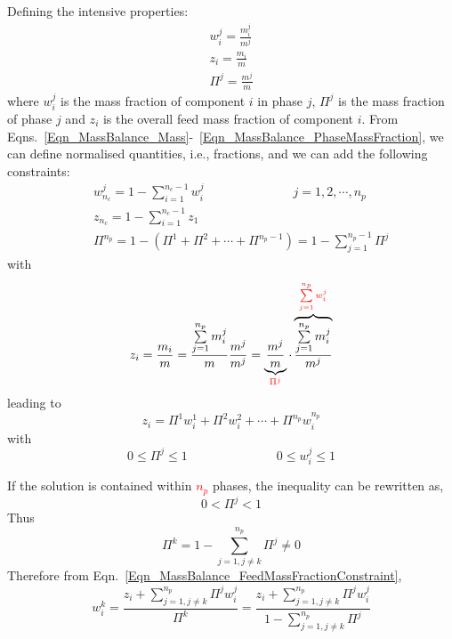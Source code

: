 \documentclass[12pts,a4paper,amsmath,amssymb,floatfix]{article}%
\renewcommand\leq{\leqslant}
\newcommand{\frc}{\displaystyle\frac}
\newcommand{\summation}{\sum\limits}
\newcommand{\red}{\textcolor{red}}
\begin{document}
Defining the intensive properties:
\begin{eqnarray}
w_{i}^{j} = \frc{m_{i}^{j}}{m^{j}} \label{Eqn_MassBalance_MassFraction} \\
z_{i} = \frc{m_{i}}{m} \label{Eqn_MassBalance_MassFractionFeeding} \\
\Pi^{j} = \frc{m^{j}}{m}\label{Eqn_MassBalance_PhaseMassFraction} 
\end{eqnarray}
where $w_{i}^{j}$ is the mass fraction of component $i$ in phase $j$, $\Pi^{j}$ is the mass fraction of phase $j$ and $z_{i}$ is the overall feed mass fraction of component $i$. From Eqns.~\ref{Eqn_MassBalance_Mass}-~\ref{Eqn_MassBalance_PhaseMassFraction}, we can define normalised quantities, i.e., fractions, and we can add the following constraints:
\begin{eqnarray}
&&w_{n_{c}}^{j} = 1 - \summation_{i=1}^{n_{c}-1}w_{i}^{j}  \hspace{3cm} j=1,2,\cdots,n_{p}  \label{Eqn_MassBalance_MassFraction2} \\
&&z_{n_{c}} = 1 - \summation_{i=1}^{n_{c}-1}z_{1}  \\
&&\Pi^{n_{p}} = 1 - \left(\Pi^{1} + \Pi^{2} + \cdots + \Pi^{n_{p}-1}\right) = 1 - \summation_{j=1}^{n_{p}-1} \Pi^{j}\label{Eqn_MassBalance_PhaseMassFraction2}
\end{eqnarray} 
with
\begin{displaymath}
  z_{i} = \frc{m_{i}}{m} = \frc{\summation_{j=1}^{n_{p}}m_{i}^{j}}{m} \frc{m^{j}}{m^{j}} = \underbrace{\frc{m^{j}}{m}}_{\red{\Pi^{j}}} \cdot \overbrace{\frc{\summation_{j=1}^{n_{p}}m_{i}^{j}}{m^{j}}}^{\red{\summation_{j=1}^{n_{p}}w_{i}^{j}}} 
\end{displaymath}
leading to
\begin{equation}
z_{i} = \Pi^{1}w_{i}^{1} + \Pi^{2}w_{i}^{2} + \cdots + \Pi^{n_{p}}w_{i}^{n_{p}}
\label{Eqn_MassBalance_FeedMassFractionConstraint}
\end{equation}
with
\begin{equation}
0\leq\Pi^{j}\leq 1 \hspace{3cm} 0\leq w_{i}^{j}\leq 1
\end{equation}

If the solution is contained within \red{$n_{p}$} phases, the inequality can be rewritten as,
\begin{equation}
0 < \Pi^{j} < 1
\end{equation}
Thus
\begin{displaymath}
\Pi^{k} = 1 - \summation_{j=1,j\neq k}^{n_{p}} \Pi^{j} \neq 0
\end{displaymath}
Therefore from Eqn.~\ref{Eqn_MassBalance_FeedMassFractionConstraint},
\begin{equation}
w_{i}^{k} = \frc{z_{i}+\summation_{j=1,j\neq k}^{n_{p}}\Pi^{j}w_{i}^{j}}{\Pi^{k}} = \frc{z_{i} + \summation_{j=1,j\neq k}^{n_{p}}\Pi^{j}w_{i}^{j}}{1-\summation_{j=1,j\neq k}^{n_{p}}\Pi^{j}}
\label{Eqn_MassBalance_FeedMassFractionConstraint2}
\end{equation}
\end{document}
